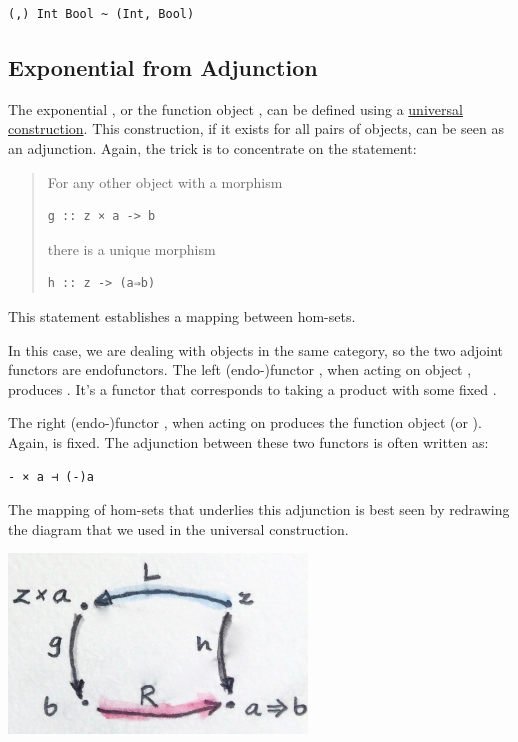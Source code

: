 \begin{verbatim}
(,) Int Bool ~ (Int, Bool)
\end{verbatim}

\subsection{Exponential from
Adjunction}\label{exponential-from-adjunction}

The exponential , or the function object , can be
defined using a
\href{https://bartoszmilewski.com/2015/03/13/function-types/}{universal
construction}. This construction, if it exists for all pairs of objects,
can be seen as an adjunction. Again, the trick is to concentrate on the
statement:

\begin{quote}
For any other object  with a morphism

\begin{verbatim}
g :: z × a -> b
\end{verbatim}

there is a unique morphism

\begin{verbatim}
h :: z -> (a⇒b)
\end{verbatim}
\end{quote}

This statement establishes a mapping between hom-sets.

In this case, we are dealing with objects in the same category, so the
two adjoint functors are endofunctors. The left (endo-)functor
, when acting on object , produces .
It's a functor that corresponds to taking a product with some fixed
.

The right (endo-)functor , when acting on  produces
the function object  (or ). Again,  is
fixed. The adjunction between these two functors is often written as:

\begin{verbatim}
- × a ⊣ (-)a
\end{verbatim}

The mapping of hom-sets that underlies this adjunction is best seen by
redrawing the diagram that we used in the universal construction.

\includegraphics[width=3.12500in]{images/adj-expo.jpg}

